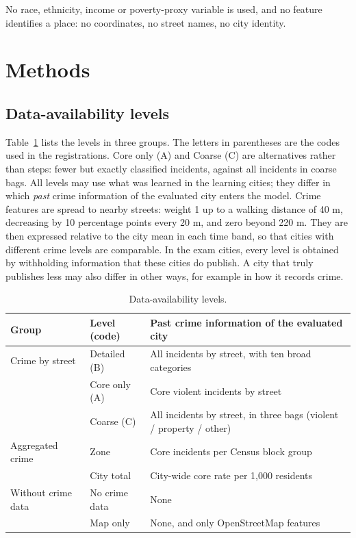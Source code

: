 \documentclass[preprint,12pt,authoryear]{elsarticle}
\begin{document}
No race, ethnicity, income or poverty-proxy variable is used, and no feature identifies a place: no coordinates, no street names, no city identity.

\section{Methods}\label{sec:methods}

\subsection{Data-availability levels}
Table~\ref{tab:niveles} lists the levels in three groups. The letters in parentheses are the codes used in the registrations. Core only (A) and Coarse (C) are alternatives rather than steps: fewer but exactly classified incidents, against all incidents in coarse bags. All levels may use what was learned in the learning cities; they differ in which \emph{past} crime information of the evaluated city enters the model. Crime features are spread to nearby streets: weight 1 up to a walking distance of 40 m, decreasing by 10 percentage points every 20 m, and zero beyond 220 m. They are then expressed relative to the city mean in each time band, so that cities with different crime levels are comparable. In the exam cities, every level is obtained by withholding information that these cities do publish. A city that truly publishes less may also differ in other ways, for example in how it records crime.

\begin{table}[htbp]
\centering\small
\caption{Data-availability levels.}
\label{tab:niveles}
\begin{tabular}{llp{}}
\toprule
Group & Level (code) & Past crime information of the evaluated city \\
\midrule
Crime by street & Detailed (B) & All incidents by street, with ten broad categories \\
 & Core only (A) & Core violent incidents by street \\
 & Coarse (C) & All incidents by street, in three bags (violent / property / other) \\
\midrule
Aggregated crime & Zone & Core incidents per Census block group \\
 & City total & City-wide core rate per 1,000 residents \\
\midrule
Without crime data & No crime data & None \\
 & Map only & None, and only OpenStreetMap features \\
\bottomrule
\end{tabular}
\end{table}
\end{document}
